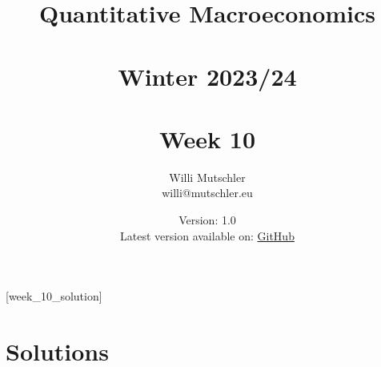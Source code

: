 
\newif\ifDisplaySolutions\DisplaySolutionstrue


\title{Quantitative Macroeconomics\\~\\Winter 2023/24\\~\\Week 10}
\author{Willi Mutschler\\willi@mutschler.eu}
\date{Version: 1.0\\Latest version available on: \href{https://github.com/wmutschl/Quantitative-Macroeconomics/releases/latest/download/week_10.pdf}{GitHub}}
\maketitle\thispagestyle{empty}

\newpage
{}[week_10_solution]
\tableofcontents\thispagestyle{empty}\newpage

\setcounter{page}{1}
\newpage
\newpage

\printbibliography
\newpage

\ifDisplaySolutions
\newpage
\appendix
\section{Solutions}

\fi
